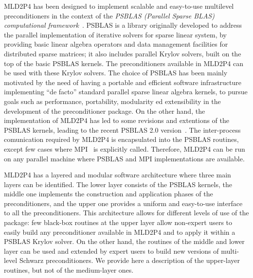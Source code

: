 MLD2P4 has been designed to implement scalable and easy-to-use multilevel preconditioners
in the context of the \emph{PSBLAS (Parallel Sparse BLAS)
computational framework}~\cite{psblas_00}. 
PSBLAS is a library originally developed to address the parallel implementation of
iterative solvers for sparse linear system, by providing basic linear algebra
operators and data management facilities for distributed sparse matrices; it
also includes parallel Krylov solvers, built on the top of the basic PSBLAS kernels.
The preconditioners available in MLD2P4 can be used with these Krylov solvers.
The choice of PSBLAS has been mainly motivated by the need of having
a portable and efficient software infrastructure implementing ``de facto'' standard
parallel sparse linear algebra kernels, to pursue goals such as performance,
portability, modularity ed extensibility in the development of the preconditioner
package. On the other hand, the implementation of MLD2P4 has led to some
revisions and extentions of the PSBLAS kernels, leading to the
recent PSBLAS 2.0 version~\cite{PSBLASGUIDE}. The inter-process comunication required
by MLD2P4 is encapsulated into the PSBLAS routines, except few cases where
MPI~\cite{MPI1} is explicitly called. Therefore, MLD2P4 can be run on any parallel
machine where PSBLAS and MPI implementations are available.

MLD2P4 has a layered and modular software architecture where three main layers can be identified. 
The lower layer consists of the PSBLAS kernels, the middle one implements
the construction and application phases of the preconditioners, and the upper one
provides a uniform and easy-to-use interface to all the preconditioners. 
This architecture allows for different levels of use of the package:
few black-box routines at the upper layer allow non-expert users to easily
build any preconditioner available in MLD2P4 and to apply it within a PSBLAS Krylov solver.
On the other hand, the routines of the middle and lower layer can be used and extended
by expert users to build new versions of multi-level Schwarz preconditioners.
We provide here a description of the upper-layer routines, but not of the
medium-layer ones.%

